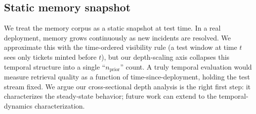 \subsection{Static memory snapshot}

We treat the memory corpus as a static snapshot at test time. In a real deployment, memory grows continuously as new incidents are resolved. We approximate this with the time-ordered visibility rule (a test window at time $t$ sees only tickets minted before $t$), but our depth-scaling axis collapses this temporal structure into a single ``$n_{\text{prior}}$'' count. A truly temporal evaluation would measure retrieval quality as a function of time-since-deployment, holding the test stream fixed. We argue our cross-sectional depth analysis is the right first step: it characterizes the steady-state behavior; future work can extend to the temporal-dynamics characterization.
